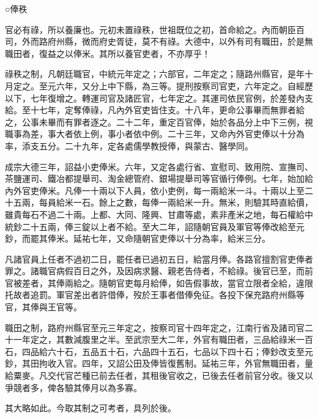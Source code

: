 
\begin{pinyinscope}

 ○俸秩



 官必有祿，所以養廉也。元初未置祿秩，世祖既位之初，首命給之。內而朝臣百司，外而路府州縣，微而府史胥徒，莫不有祿。大德中，以外有司有職田，於是無職田者，復益之以俸米。其所以養官吏者，不亦厚乎！



 祿秩之制，凡朝廷職官，中統元年定之；六部官，二年定之；隨路州縣官，是年十月定之。至元六年，又分上中下縣，為三等。提刑按察司官吏，六年定之。自經歷以下，七年復增之。轉運司官及諸匠官，七年定之。其運司依民官例，於差發內支給。至十七年，定奪俸祿，凡內外官吏皆住支。十八年，更命公事畢而無罪者給之，公事未畢而有罪者逐之。二十二年，重定百官俸，始於各品分上中下三例，視職事為差，事大者依上例，事小者依中例。二十三年，又命內外官吏俸以十分為率，添支五分。二十九年，定各處儒學教授俸，與蒙古、醫學同。



 成宗大德三年，詔益小吏俸米。六年，又定各處行省、宣慰司、致用院、宣撫司、茶鹽運司、鐵冶都提舉司、淘金總管府、銀場提舉司等官循行俸例。七年，始加給內外官吏俸米。凡俸一十兩以下人員，依小吏例，每一兩給米一斗。十兩以上至二十五兩，每員給米一石。餘上之數，每俸一兩給米一升。無米，則驗其時直給價，雖貴每石不過二十兩。上都、大同、隆興、甘肅等處，素非產米之地，每石權給中統鈔二十五兩，俸三錠以上者不給。至大二年，詔隨朝官員及軍官等俸改給至元鈔，而罷其俸米。延祐七年，又命隨朝官吏俸以十分為率，給米三分。



 凡諸官員上任者不過初二日，罷任者已過初五日，給當月俸。各路官擅割官吏俸者罪之。諸職官病假百日之外，及因病求醫、親老告侍者，不給祿。後官已至，而前官被差者，其俸兩給之。隨朝官吏每月給俸，如告假事故，當官立限者全給，違限托故者追罰。軍官差出者許借俸，歿於王事者借俸免征。各投下保充路府州縣等官，其俸與王官等。



 職田之制，路府州縣官至元三年定之，按察司官十四年定之，江南行省及諸司官二十一年定之，其數減腹里之半。至武宗至大二年，外官有職田者，三品給祿米一百石，四品給六十石，五品五十石，六品四十五石，七品以下四十石；俸鈔改支至元鈔，其田拘收入官。四年，又詔公田及俸皆復舊制。延祐三年，外官無職田者，量給粟麥。凡交代官芒種已前去任者，其租後官收之，已後去任者前官分收。後又以爭競者多，俾各驗其俸月以為多寡。



 其大略如此。今取其制之可考者，具列於後。




\end{pinyinscope}
